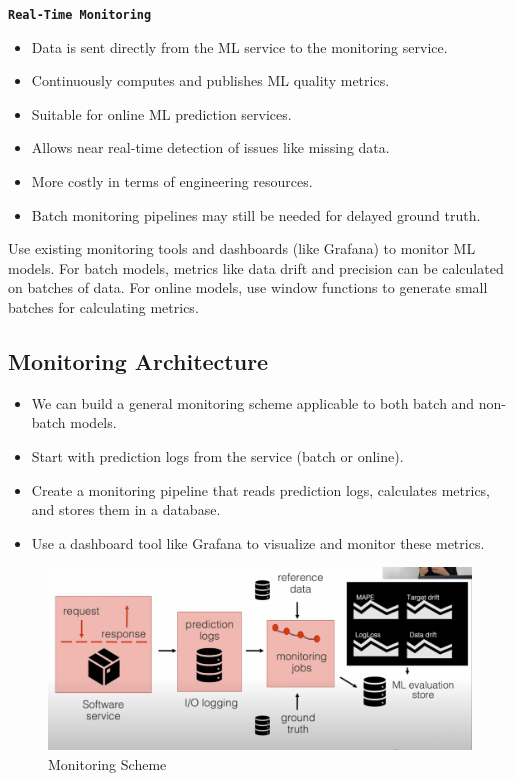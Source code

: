 \documentclass[letterpaper,12pt,notitlepage,twoside]{report}
\begin{document}
\texttt{\textbf{Real-Time Monitoring}}
\begin{itemize}[noitemsep, topsep=0pt]
    \item Data is sent directly from the ML service to the monitoring service.
    \item Continuously computes and publishes ML quality metrics.
    \item Suitable for online ML prediction services.
    \item Allows near real-time detection of issues like missing data.
    \item More costly in terms of engineering resources.
    \item Batch monitoring pipelines may still be needed for delayed ground truth.
\end{itemize}

Use existing monitoring tools and dashboards (like Grafana) to monitor ML models.  For batch models, metrics like data drift and precision can be calculated on batches of data. For online models, use window functions to generate small batches for calculating metrics.

\subsection{Monitoring Architecture}
\begin{itemize}[noitemsep, topsep=0pt]
    \item We can build a general monitoring scheme applicable to both batch and non-batch models.
    \item Start with prediction logs from the service (batch or online).
    \item Create a monitoring pipeline that reads prediction logs, calculates metrics, and stores them in a database.
    \item Use a dashboard tool like Grafana to visualize and monitor these metrics.
\end{itemize}

\begin{figure}[h]
	\centering
	\includegraphics[width=\textwidth]{Images/monitoring-scheme.png}
	\caption{Monitoring Scheme}
	\label{fig:12}
\end{figure}
\end{document}
